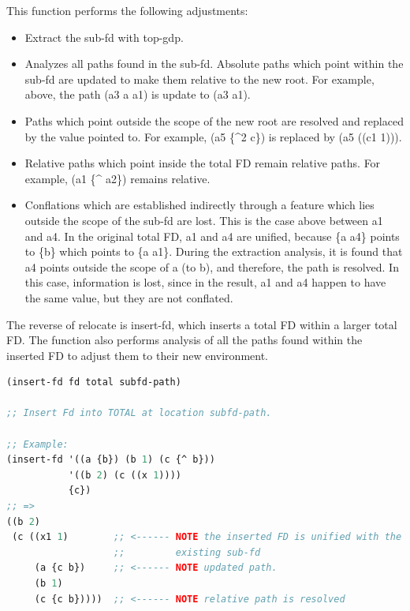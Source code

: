 \documentclass[10pt,a4paper]{report}
\begin{document}
This function performs the following adjustments:
\begin{itemize}
\item Extract the sub-fd with top-gdp.

\item Analyzes all paths found in the sub-fd.  Absolute paths which point within
the sub-fd are updated to make them relative to the new root.  For example,
above, the path (a3 {a a1}) is update to (a3 {a1}).

\item Paths which point outside the scope of the new root are resolved and
replaced by the value pointed to.  For example, (a5 \{\^{}2 c\}) is replaced by
(a5 ((c1 1))).

\item Relative paths which point inside the total FD remain relative paths.  For
example, (a1 \{\^{} a2\}) remains relative.

\item Conflations which are established indirectly through a feature which lies
outside the scope of the sub-fd are lost.  This is the case above between
a1 and a4.  In the original total FD, a1 and a4 are unified, because \{a a4\}
points to \{b\} which points to \{a a1\}.  During the extraction analysis, it
is found that a4 points outside the scope of a (to b), and therefore, the
path is resolved.  In this case, information is lost, since in the result,
a1 and a4 happen to have the same value, but they are not conflated.
\end{itemize}

The reverse of relocate is insert-fd, which inserts a total FD within a
larger total FD.  The function also performs analysis of all the paths
found within the inserted FD to adjust them to their new environment.

\begin{lstlisting}[language=Lisp]
(insert-fd fd total subfd-path)
 
;; Insert Fd into TOTAL at location subfd-path.

;; Example: 
(insert-fd '((a {b}) (b 1) (c {^ b}))
           '((b 2) (c ((x 1))))
           {c})
;; =>
((b 2)
 (c ((x1 1)        ;; <------ NOTE the inserted FD is unified with the
                   ;;         existing sub-fd
     (a {c b})     ;; <------ NOTE updated path.
     (b 1)
     (c {c b}))))  ;; <------ NOTE relative path is resolved

\end{lstlisting}
\end{document}
